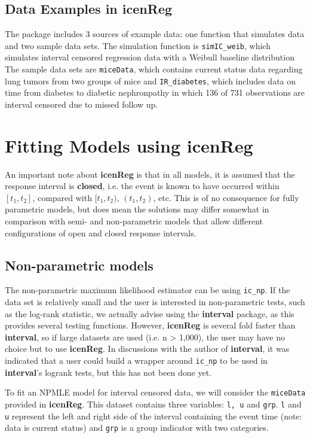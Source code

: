 \documentclass[a4paper]{article}
\begin{document}
  
\subsection{Data Examples in {\bf{icenReg}} }
  
The package includes 3 sources of example data: one function that simulates data and two sample data sets. The simulation function is \texttt{simIC\_weib}, which simulates interval censored regression data with a Weibull baseline distribution The sample data sets are \texttt{miceData}, which contains current status data regarding lung tumors from two groups of mice and \texttt{IR\_diabetes}, which includes data on time from diabetes to diabetic nephronpathy in which 136 of 731 observations are interval censored due to missed follow up. 
  
  
\section{Fitting Models using {\bf{icenReg}} }
  
An important note about {\bf icenReg} is that in all models, it is assumed that the response interval is {\bf closed}, i.e. the event is known to have occurred within $[t_1, t_2]$, compared with $[t_1, t_2)$, $(t_1, t_2)$, etc. This is of no consequence for fully parametric models, but does mean the solutions may differ somewhat in comparison with semi- and non-parametric models that allow different configurations of open and closed response intervals. 
  
\subsection{Non-parametric models}
  
The non-parametric maximum likelihood estimator can be using \texttt{ic\_np}. If the data set is relatively small and the user is interested in non-parametric tests, such as the log-rank statistic, we actually advise using the {\bf interval} package, as this provides several testing functions. However, {\bf icenReg} is several fold faster than {\bf interval}, so if large datasets are used (i.e. n > 1,000), the user may have no choice but to use {\bf icenReg}. In discussions with the author of {\bf interval}, it was indicated that a user could build a wrapper around \texttt{ic\_np} to be used in {\bf interval}'s logrank tests, but this has not been done yet. 

  
To fit an NPMLE model for interval censored data, we will consider the \texttt{miceData} provided in {\bf icenReg}. This dataset contains three variables: \texttt{l, u} and \texttt{grp}. \texttt{l} and \texttt{u} represent the left and right side of the interval containing the event time (note: data is current status) and \texttt{grp} is a group indicator with two categories.
\end{document}
